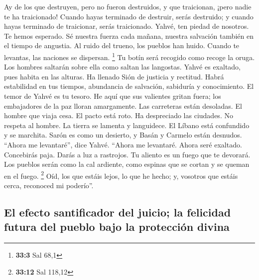 \begin{paracol}{2}
 Ay de los que destruyen, pero no fueron destruidos, y que
traicionan, ¡pero nadie te ha traicionado! Cuando hayas terminado de
destruir, serás destruido; y cuando hayas terminado de traicionar, serás
traicionado.  Yahvé, ten piedad de nosotros. Te hemos
esperado. Sé nuestra fuerza cada mañana, nuestra salvación también en el
tiempo de angustia.  Al ruido del trueno, los pueblos han
huido. Cuando te levantas, las naciones se dispersan. \footnote{\textbf{33:3}
  Sal 68,1}  Tu botín será recogido como recoge la oruga.
Los hombres saltarán sobre ella como saltan las langostas.
 Yahvé es exaltado, pues habita en las alturas. Ha llenado
Sión de justicia y rectitud.  Habrá estabilidad en tus
tiempos, abundancia de salvación, sabiduría y conocimiento. El temor de
Yahvé es tu tesoro.  He aquí que sus valientes gritan
fuera; los embajadores de la paz lloran amargamente.  Las
carreteras están desoladas. El hombre que viaja cesa. El pacto está
roto. Ha despreciado las ciudades. No respeta al hombre. 
La tierra se lamenta y languidece. El Líbano está confundido y se
marchita. Sarón es como un desierto, y Basán y Carmelo están desnudos.
 ``Ahora me levantaré'', dice Yahvé. ``Ahora me
levantaré. Ahora seré exaltado.  Concebirás paja. Darás a
luz a rastrojos. Tu aliento es un fuego que te devorará. 
Los pueblos serán como la cal ardiente, como espinas que se cortan y se
queman en el fuego. \footnote{\textbf{33:12} Sal 118,12} 
Oíd, los que estáis lejos, lo que he hecho; y, vosotros que estáis
cerca, reconoced mi poderío''.

\hypertarget{el-efecto-santificador-del-juicio-la-felicidad-futura-del-pueblo-bajo-la-protecciuxf3n-divina}{%
\subsection{El efecto santificador del juicio; la felicidad futura del
pueblo bajo la protección
divina}\label{el-efecto-santificador-del-juicio-la-felicidad-futura-del-pueblo-bajo-la-protecciuxf3n-divina}}


\end{paracol}
